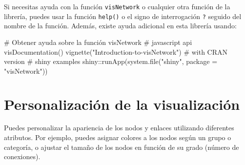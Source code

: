 \documentclass[
  letterpaper,
  DIV=11,
  numbers=noendperiod]{scrreprt}
\newenvironment{Shaded}{\begin{snugshade}}{\end{snugshade}}
\newcommand{\AttributeTok}[1]{\textcolor[rgb]{0.40,0.45,0.13}{#1}}
\newcommand{\CommentTok}[1]{\textcolor[rgb]{0.37,0.37,0.37}{#1}}
\newcommand{\FunctionTok}[1]{\textcolor[rgb]{0.28,0.35,0.67}{#1}}
\newcommand{\NormalTok}[1]{\textcolor[rgb]{0.00,0.23,0.31}{#1}}
\newcommand{\SpecialCharTok}[1]{\textcolor[rgb]{0.37,0.37,0.37}{#1}}
\newcommand{\StringTok}[1]{\textcolor[rgb]{0.13,0.47,0.30}{#1}}
\begin{document}
Si necesitas ayuda con la función \texttt{visNetwork} o cualquier otra
función de la librería, puedes usar la función \texttt{help()} o el
signo de interrogación \texttt{?} seguido del nombre de la función.
Además, existe ayuda adicional en esta librería usando:

\begin{Shaded}
\begin{Highlighting}[]
\CommentTok{\# Obtener ayuda sobre la función visNetwork}
\CommentTok{\# javascript api}
\FunctionTok{visDocumentation}\NormalTok{()}
\FunctionTok{vignette}\NormalTok{(}\StringTok{"Introduction{-}to{-}visNetwork"}\NormalTok{) }\CommentTok{\# with CRAN version}
\CommentTok{\# shiny examples}
\NormalTok{shiny}\SpecialCharTok{::}\FunctionTok{runApp}\NormalTok{(}\FunctionTok{system.file}\NormalTok{(}\StringTok{"shiny"}\NormalTok{, }\AttributeTok{package =} \StringTok{"visNetwork"}\NormalTok{))}
\end{Highlighting}
\end{Shaded}

\section{Personalización de la
visualización}\label{personalizaciuxf3n-de-la-visualizaciuxf3n}

Puedes personalizar la apariencia de los nodos y enlaces utilizando
diferentes atributos. Por ejemplo, puedes asignar colores a los nodos
según un grupo o categoría, o ajustar el tamaño de los nodos en función
de su grado (número de conexiones).
\end{document}
